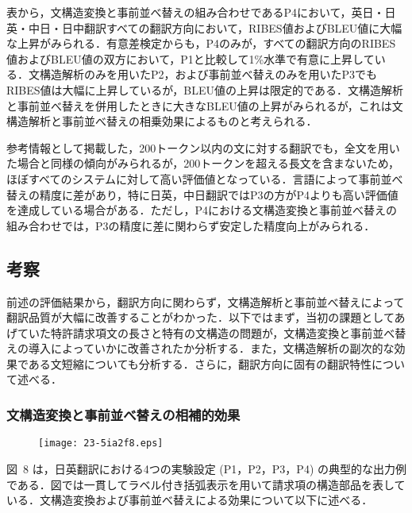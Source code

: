 \documentclass[japanese]{jnlp_1.4}
\begin{document}
表から，文構造変換と事前並べ替えの組み合わせであるP4において，英日・日英・中日・日中翻訳すべての翻訳方向において，RIBES値およびBLEU値に大幅な上昇がみられる．有意差検定からも，P4のみが，すべての翻訳方向のRIBES値およびBLEU値の双方において，P1と比較して1{\%}水準で有意に上昇している．文構造解析のみを用いたP2，および事前並べ替えのみを用いたP3でもRIBES値は大幅に上昇しているが，BLEU値の上昇は限定的である．文構造解析と事前並べ替えを併用したときに大きなBLEU値の上昇がみられるが，これは文構造解析と事前並べ替えの相乗効果によるものと考えられる．

参考情報として掲載した，200トークン以内の文に対する翻訳でも，全文を用いた場合と同様の傾向がみられるが，200トークンを超える長文を含まないため，ほぼすべてのシステムに対して高い評価値となっている．言語によって事前並べ替えの精度に差があり，特に日英，中日翻訳ではP3の方がP4よりも高い評価値を達成している場合がある．ただし，P4における文構造変換と事前並べ替えの組み合わせでは，P3の精度に差に関わらず安定した精度向上がみられる．


\subsection{考察}

前述の評価結果から，翻訳方向に関わらず，文構造解析と事前並べ替えによって翻訳品質が大幅に改善することがわかった．以下ではまず，当初の課題としてあげていた特許請求項文の長さと特有の文構造の問題が，文構造変換と事前並べ替えの導入によっていかに改善されたか分析する．また，文構造解析の副次的な効果である文短縮についても分析する．さらに，翻訳方向に固有の翻訳特性について述べる．


\subsubsection{文構造変換と事前並べ替えの相補的効果}

\begin{figure}[t]
\begin{center}
\texttt{[image: 23-5ia2f8.eps]}
\end{center}
\label{fig08}
\end{figure}

図~8 は，日英翻訳における4つの実験設定 (P1，P2，P3，P4) の典型的な出力例である．図では一貫してラベル付き括弧表示を用いて請求項の構造部品を表している．文構造変換および事前並べ替えによる効果について以下に述べる．
\end{document}

